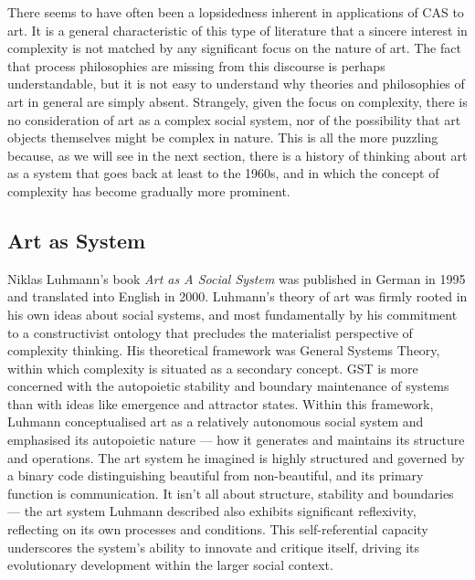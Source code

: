         There seems to have often been a lopsidedness inherent in applications of CAS to art. It is a general characteristic of this type of literature that a sincere interest in complexity is not matched by any significant focus on the nature of art. The fact that process philosophies are missing from this discourse is perhaps understandable, but it is not easy to understand why theories and philosophies of art in general are simply absent. Strangely, given the focus on complexity, there is no consideration of art as a complex social system, nor of the possibility that art objects themselves might be complex in nature. This is all the more puzzling because, as we will see in the next section, there is a history of thinking about art as a system that goes back at least to the 1960s, and in which the concept of complexity has become gradually more prominent.

    \subsection{Art as System}\label{sec:ArtAsASystem}

        Niklas Luhmann's book \emph{Art as A Social System} was published in German in 1995 and translated into English in 2000. Luhmann's theory of art was firmly rooted in his own ideas about social systems, and most fundamentally by his commitment to a constructivist ontology that precludes the materialist perspective of complexity thinking. His theoretical framework was General Systems Theory, within which complexity is situated as a secondary concept. GST is more concerned with the autopoietic stability and boundary maintenance of systems than with ideas like emergence and attractor states. Within this framework, Luhmann conceptualised art as a relatively autonomous social system and emphasised its autopoietic nature — how it generates and maintains its structure and operations. The art system he imagined is highly structured and governed by a binary code distinguishing beautiful from non-beautiful, and its primary function is communication. It isn't all about structure, stability and boundaries — the art system Luhmann described also exhibits significant reflexivity, reflecting on its own processes and conditions. This self-referential capacity underscores the system's ability to innovate and critique itself, driving its evolutionary development within the larger social context.

